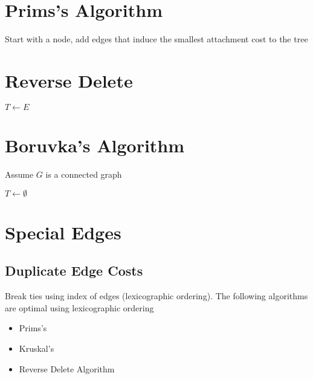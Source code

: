 \section{Prims's Algorithm}

  Start with a node, add edges that induce the smallest attachment cost
  to the tree

\section{Reverse Delete}

  \begin{algorithm}[H]
    $ T \gets E $\;
  \end{algorithm}

\section{Boruvka's Algorithm}

  Assume $ G $ is a connected graph

  \begin{algorithm}[H]
    $ T \gets \emptyset $\;
  \end{algorithm}


\section{Special Edges}

  \subsection{Duplicate Edge Costs}

    Break ties using index of edges (lexicographic ordering). The following
    algorithms are optimal using lexicographic ordering
    \begin{itemize}
      \item Prims's
      \item Kruskal’s
      \item Reverse Delete Algorithm
    \end{itemize}

